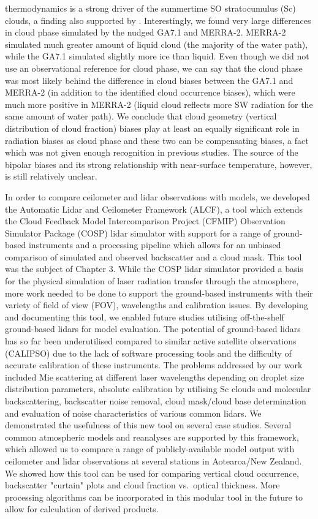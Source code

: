 thermodynamics is a strong driver of the summertime SO stratocumulus (Sc) clouds,
a finding also supported by \cite{hartery2020b}. Interestingly, we found
very large differences in cloud phase simulated by the nudged GA7.1 and MERRA-2.
MERRA-2 simulated much greater amount of liquid cloud (the majority of
the water path), while the GA7.1 simulated slightly more ice than liquid.
Even though we did not use an observational reference for cloud phase,
we can say that the cloud phase was most likely behind the difference in
cloud biases between the GA7.1 and MERRA-2 (in addition to the identified cloud occurrence biases), which were much more positive
in MERRA-2 (liquid cloud reflects more SW radiation for the same amount of water
path). We conclude that cloud geometry (vertical distribution of cloud fraction)
biases play at least an equally
significant role in radiation biases as cloud phase and these two can be
compensating biases, a fact which was not given enough recognition in previous
studies. The source of the bipolar biases and its strong relationship with
near-surface temperature, however, is still relatively unclear.

In order to compare ceilometer and lidar observations with models,
we developed the Automatic Lidar and Ceilometer Framework (ALCF),
a tool which extends the Cloud Feedback Model Intercomparison Project (CFMIP) Observation Simulator Package (COSP) lidar simulator with support for a range
of ground-based instruments and a processing pipeline which allows
for an unbiased comparison of simulated and observed backscatter and a cloud mask.
This tool was the subject of Chapter 3. While the COSP lidar simulator
provided a basis for the physical simulation of laser radiation transfer
through the atmosphere, more work needed to be done to support the ground-based
instruments with their variety of field of view (FOV), wavelengths and
calibration issues. By developing and documenting this tool, we enabled future
studies utilising off-the-shelf ground-based lidars for model evaluation.
The potential of ground-based lidars has so far been underutilised compared
to similar active satellite observations (CALIPSO) due to the
lack of software processing tools and the difficulty of accurate calibration
of these instruments. The problems addressed by our work included Mie
scattering at different laser wavelengths depending on droplet size distribution
parameters, absolute calibration by utilising Sc clouds and molecular
backscattering, backscatter noise removal, cloud mask/cloud base determination 
and evaluation of noise characteristics of various common lidars. We demonstrated
the
usefulness of this new tool on several case studies. Several common atmospheric
models and reanalyses are supported by this framework, which allowed us to compare
a range of publicly-available model output with ceilometer and lidar observations
at several stations in Aotearoa/New Zealand. We showed how this tool can be used
for comparing vertical cloud occurrence, backscatter "curtain" plots
and cloud fraction vs.~optical thickness. More processing algorithms can
be incorporated in this modular tool in the future to allow for calculation of
derived products.

